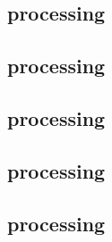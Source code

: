 \subsection{\conditionallyGetShiftingFactorName{}   processing} \label{rlp utils: instructions: condtionally shift}      
\subsection{\rlpUtilsInstInteger{}                  processing} \label{rlp utils: instructions: integer processing}      
\subsection{\rlpUtilsInstByteString{}               processing} \label{rlp utils: instructions: byte string processing}  
\subsection{\rlpUtilsInstBytesThirtyTwo{}           processing} \label{rlp utils: instructions: bytes32 processing}      
\subsection{\rlpUtilsInstDataPricing{}              processing} \label{rlp utils: instructions: data pricing processing} 

